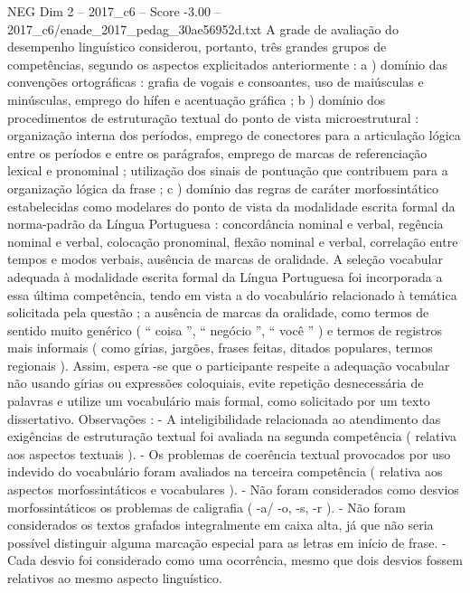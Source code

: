 \begin{textsample}{NEG Dim 2 – 2017\_c6 – Score -3.00 – 2017\_c6/enade\_2017\_pedag\_30ae56952d.txt}
A grade de avaliação do desempenho linguístico considerou, portanto, três grandes grupos de competências, segundo os aspectos explicitados anteriormente : a ) domínio das convenções ortográficas : grafia de vogais e consoantes, uso de maiúsculas e minúsculas, emprego do hífen e acentuação gráfica ; b ) domínio dos procedimentos de estruturação textual do ponto de vista microestrutural : organização interna dos períodos, emprego de conectores para a articulação lógica entre os períodos e entre os parágrafos, emprego de marcas de referenciação lexical e pronominal ; utilização dos sinais de pontuação que contribuem para a organização lógica da frase ; c ) domínio das regras de caráter morfossintático estabelecidas como modelares do ponto de vista da modalidade escrita formal da norma-padrão da Língua Portuguesa : concordância nominal e verbal, regência nominal e verbal, colocação pronominal, flexão nominal e verbal, correlação entre tempos e modos verbais, ausência de marcas de oralidade.
A seleção vocabular adequada à modalidade escrita formal da Língua Portuguesa foi incorporada a essa última competência, tendo em vista a do vocabulário relacionado à temática solicitada pela questão ; a ausência de marcas da oralidade, como termos de sentido muito genérico ( “ coisa ”, “ negócio ”, “ você ” ) e termos de registros mais informais ( como gírias, jargões, frases feitas, ditados populares, termos regionais ).
Assim, espera -se que o participante respeite a adequação vocabular não usando gírias ou expressões coloquiais, evite repetição desnecessária de palavras e utilize um vocabulário mais formal, como solicitado por um texto dissertativo.
Observações : - A inteligibilidade relacionada ao atendimento das exigências de estruturação textual foi avaliada na segunda competência ( relativa aos aspectos textuais ). - Os problemas de coerência textual provocados por uso indevido do vocabulário foram avaliados na terceira competência ( relativa aos aspectos morfossintáticos e vocabulares ). - Não foram considerados como desvios morfossintáticos os problemas de caligrafia ( -a/ -o, -s, -r ). - Não foram considerados os textos grafados integralmente em caixa alta, já que não seria possível distinguir alguma marcação especial para as letras em início de frase. - Cada desvio foi considerado como uma ocorrência, mesmo que dois desvios fossem relativos ao mesmo aspecto linguístico.

\end{textsample}
